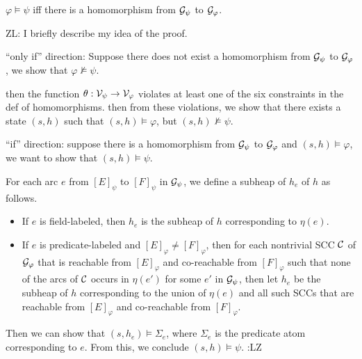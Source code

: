 \documentclass{llncs}
\newcommand{\zhilin}[1]{\color{red} {ZL: #1 :LZ} \color{black}}
\newcommand{\tl}[1]{\color{blue} {TL: #1 :LT} \color{black}}
\begin{document}

\begin{lemma}
$\varphi  \models \psi$ iff there is a homomorphism from $\mathcal{G}_\psi$ to $\mathcal{G}_\varphi$.
\end{lemma}


\zhilin{
I briefly describe my idea of the proof.

``only if'' direction: Suppose there does not exist a homomorphism from $\mathcal{G}_\psi$ to $\mathcal{G}_\varphi$, we show that $\varphi \not \models \psi$.

then the function $\theta: \mathcal{V}_\psi \rightarrow \mathcal{V}_\varphi$ violates at least one of the six constraints in the def of homomorphisms. then from these violations, we show that there exists a state $(s,h)$ such that $(s,h) \models \varphi$, but $(s,h) \not \models \psi$.



``if'' direction: suppose there is a homomorphism from $\mathcal{G}_\psi$ to $\mathcal{G}_\varphi$ and $(s,h) \models \varphi$, we want to show that $(s,h) \models \psi$.

For each arc $e$ from $[E]_\psi$ to $[F]_\psi$ in $\mathcal{G}_\psi$, we define a subheap of $h_e$ of $h$ as follows.
\begin{itemize}
\item If $e$ is field-labeled, then $h_e$ is the subheap of $h$ corresponding to $\eta(e)$.
%
\item If $e$ is predicate-labeled and $[E]_\varphi \neq [F]_\varphi$, then for each nontrivial SCC $\mathcal{C}$ of $\mathcal{G}_\varphi$ that is reachable from $[E]_\varphi$ and co-reachable from $[F]_\varphi$ such that none of the arcs of $\mathcal{C}$ occurs in $\eta(e')$ for some $e'$ in $\mathcal{G}_\psi$, then let $h_e$ be the subheap of $h$ corresponding to the union of $\eta(e)$ and all such SCCs that are reachable from $[E]_\varphi$ and co-reachable from $[F]_\varphi$.
\end{itemize}

Then we can show that $(s,h_e) \models \Sigma_e$, where $\Sigma_e$ is the predicate atom corresponding to $e$. From this, we conclude $(s,h) \models \psi$.
}
\end{document}
